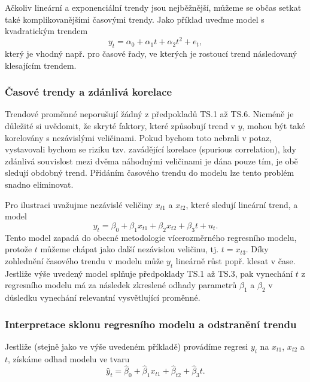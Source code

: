 Ačkoliv lineární a exponenciální trendy jsou nejběžnější, 
můžeme se občas setkat také komplikovanějšími časovými trendy. Jako příklad uveďme 
model s kvadratickým trendem
\begin{equation}
y_t = \alpha_0 + \alpha_1 t + \alpha_2 t^2 + e_t,
\end{equation}
který je vhodný např. pro časové řady, ve kterých je rostoucí 
trend následovaný klesajícím trendem.

\subsubsection{Časové trendy a zdánlivá korelace}

Trendové proměnné neporušují žádný z předpokladů TS.1 až 
TS.6. Nicméně je důležité si uvědomit, že skryté faktory, 
které způsobují trend v $y$, mohou být také korelovány s 
nezávislými veličinami. Pokud bychom toto nebrali v potaz, 
vystavovali bychom se riziku tzv. zavádějící korelace (spurious 
correlation), kdy zdánlivá souvislost mezi dvěma náhodnými 
veličinami je dána pouze tím, je obě sledují obdobný trend. 
Přidáním časového trendu do modelu lze tento problém snadno eliminovat.

Pro ilustraci uvažujme nezávislé veličiny $x_{t1}$ a $x_{t2}$, 
které sledují lineární trend, a model
\begin{equation}
y_t = \beta_0 + \beta_1 x_{t1} + \beta_2 x_{t2} + \beta_3 t + u_t.
\end{equation}
Tento model zapadá do obecné metodologie vícerozměrného 
regresního modelu, protože $t$ můžeme chápat jako další 
nezávislou veličinu, tj. $t = x_{t3}$. Díky zohlednění 
časového trendu v modelu může $y_t$ lineárně růst popř. klesat 
v čase. Jestliže výše uvedený model splňuje předpoklady TS.1 až 
TS.3, pak vynechání $t$ z regresního modelu má za následek 
zkreslené odhady parametrů $\beta_1$ a $\beta_2$ v důsledku 
vynechání relevantní vysvětlující proměnné.

\subsubsection{Interpretace sklonu regresního modelu a odstranění trendu}

Jestliže (stejně jako ve výše uvedeném příkladě) provádíme regresi 
$y_i$ na $x_{t1}$, $x_{t2}$ a $t$, získáme odhad modelu ve tvaru
\begin{equation}
\hat{y}_t = \hat{\beta}_0 + \hat{\beta}_1 x_{t1} + \hat{\beta}_{t2} + 
\hat{\beta}_3 t.
\end{equation}

